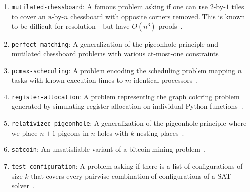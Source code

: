 \begin{enumerate}
    \item \texttt{mutilated-chessboard}: A famous problem asking if one can use $2$-by-$1$ tiles to cover an $n$-by-$n$ chessboard with opposite corners removed. This is known to be difficult for resolution~\cite{chessboard-resolution}, but have $O(n^3)$ \pr proofs~\cite{mutilatedchessboard-pr}.
    \item \texttt{perfect-matching}: A generalization of the pigeonhole principle and mutilated chessboard problems with various at-most-one constraints~\cite{bipartgen}
    \item \texttt{pcmax-scheduling}: A problem encoding the scheduling problem mapping $n$ tasks with known execution times to $m$ identical processors~\cite{pcmax}.
    \item \texttt{register-allocation}: A problem representing the graph coloring problem generated by simulating register allocation on individual Python functions~\cite{register-allocation}.
    \item \texttt{relativized\_pigeonhole}: A generalization of the pigeonhole principle where we place $n+1$ pigeons in $n$ holes with $k$ nesting places~\cite{relativized-pigeonhole}.
    \item \texttt{satcoin}: An unsatisfiable variant of a bitcoin mining problem~\cite{satcoin}.
    \item \texttt{test\_configuration}: A problem asking if there is a list of configurations of size $k$ that covers every pairwise combination of configurations of a SAT solver~\cite{test-configuration}.
\end{enumerate}

